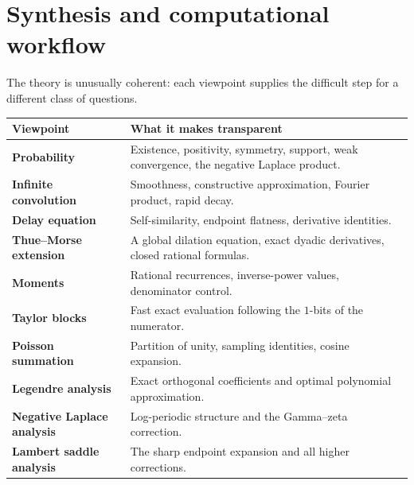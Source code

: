 \documentclass[11pt,oneside]{article}
\theoremstyle{definition}
\theoremstyle{remark}
\begin{document}
\section{Synthesis and computational workflow}\label{sec:synthesis}

The theory is unusually coherent: each viewpoint supplies the difficult step for a
different class of questions.

\begin{center}
\begin{tabularx}{0.95\textwidth}{>{\bfseries}p{}X}
\toprule
Viewpoint & What it makes transparent\\
\midrule
Probability & Existence, positivity, symmetry, support, weak convergence, the
negative Laplace product.\\
Infinite convolution & Smoothness, constructive approximation, Fourier product,
rapid decay.\\
Delay equation & Self-similarity, endpoint flatness, derivative identities.\\
Thue--Morse extension & A global dilation equation, exact dyadic derivatives,
closed rational formulas.\\
Moments & Rational recurrences, inverse-power values, denominator control.\\
Taylor blocks & Fast exact evaluation following the $1$-bits of the numerator.\\
Poisson summation & Partition of unity, sampling identities, cosine expansion.\\
Legendre analysis & Exact orthogonal coefficients and optimal polynomial
approximation.\\
Negative Laplace analysis & Log-periodic structure and the Gamma--zeta correction.\\
Lambert saddle analysis & The sharp endpoint expansion and all higher corrections.\\
\bottomrule
\end{tabularx}
\end{center}
\end{document}
